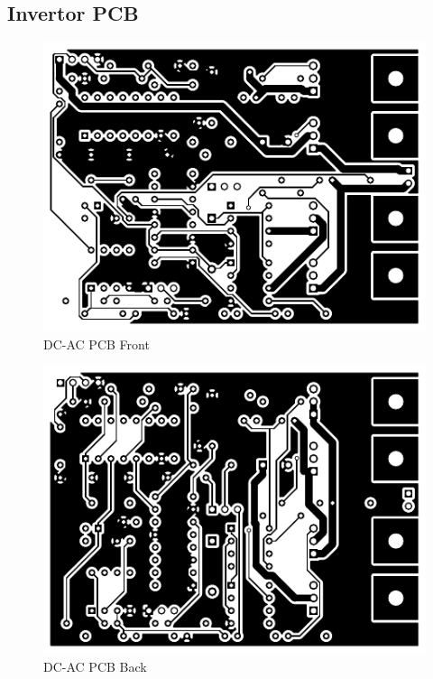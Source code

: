 \documentclass[final]{scrreprt} %
\begin{document}
\begin{appendices}
\chapter{Invertor PCB}
\label{app:invertor-pcb}
\begin{figure}[h]
	\includegraphics[width=\linewidth]{resources/DC-AC-F_Cu-rc.pdf}
	\caption{DC-AC PCB Front}
	\label{fig:DC-AC-PCB-Front}
\end{figure}

\begin{figure}[h]
	\includegraphics[width=\linewidth]{resources/DC-AC-B_Cu-rc.pdf}
	\caption{DC-AC PCB Back}
	\label{fig:DC-AC-PCB-Back}
\end{figure}


\end{appendices}
\end{document}
